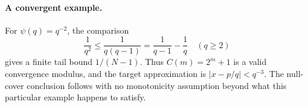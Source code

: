 \paragraph{A convergent example.}
For $\psi(q)=q^{-2}$, the comparison
\[
 \frac1{q^2}\le\frac1{q(q-1)}=\frac1{q-1}-\frac1q\quad(q\ge2)
\]
gives a finite tail bound $1/(N-1)$.  Thus $C(m)=2^m+1$ is a valid
convergence modulus, and the target approximation is $|x-p/q|<q^{-3}$.
The null-cover conclusion follows with no monotonicity assumption beyond
what this particular example happens to satisfy.
